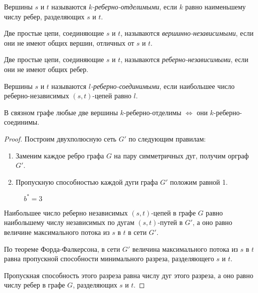 \begin{definition}
    Вершины $ s $ и $ t $ называются \emph{$ k $-реберно-отделимыми}, если $ k $ равно наименьшему числу ребер, разделяющих $ s $ и $ t $.
\end{definition}

\begin{definition}
    Две простые цепи, соединяющие $ s $ и $ t $, называются \emph{вершинно-независимыми}, если они не имеют общих вершин, отличных от $ s $ и $ t $.
\end{definition}

\begin{definition}
    Две простые цепи, соединяющие $ s $ и $ t $, называются \emph{реберно-независимыми}, если они не имеют общих ребер.
\end{definition}

\begin{definition}
    Вершины $ s $ и $ t $ называются \emph{$ l $-реберно-соединимыми}, если наибольшее число \\ реберно-независимых $ (s,t) $-цепей равно $ l $.
\end{definition}

\begin{theorem}
    В связном графе любые две вершины $ k $-реберно-отделимы $ \iff $ они $ k $-реберно-соединимы.
\end{theorem}

\begin{proof}
    Построим двухполюсную сеть $ G' $ по следующим правилам:
    \begin{enumerate}
        \item Заменим каждое ребро графа $ G $ на пару симметричных дуг, получим орграф $ G' $.
        \item Пропускную способностью каждой дуги графа $ G' $ положим равной 1.
    \end{enumerate}
    \begin{figure}[H]
        \centering
        \caption*{$ b^* = 3 $}
        \label{fig:fig_33}
    \end{figure}

    Наибольшее число реберно независимых $ (s,t) $-цепей в графе $ G $ равно наибольшему числу независимых по дугам $ (s,t) $-путей в $ G' $, а оно равно величине максимального потока из $ s $ в $ t $ в сети $ G' $.

    По теореме Форда-Фалкерсона, в сети $ G' $ величина максимального потока из $ s $ в $ t $ равна пропускной способности минимального разреза, разделяющего $ s $ и $ t $.

    Пропускная способность этого разреза равна числу дуг этого разреза, а оно равно числу ребер в графе $ G $, разделяющих $ s $ и $ t $.
\end{proof}